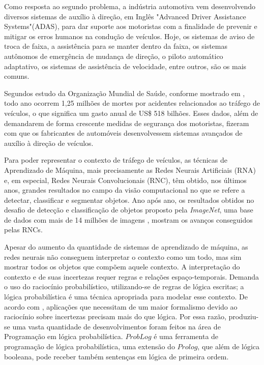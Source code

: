 \documentclass[
	12pt,				%
    oneside,			%
	a4paper,			%
	english,			%
	french,				%
	spanish,			%
	brazil,				%
	]{abntex2}
\begin{document}
Como resposta ao segundo problema, a indústria automotiva vem desenvolvendo diversos sistemas de auxílio à direção, em Inglês "Advanced Driver Assistance Systems"\newline (ADAS), para dar suporte aos motoristas com a finalidade de prevenir e mitigar os erros humanos na condução de veículos. Hoje, os sistemas de aviso de troca de faixa, a assistência para se manter dentro da faixa, os sistemas autônomos de emergência de mudança de direção, o  piloto automático adaptativo, os  sistemas de assistência de velocidade, entre outros, são os mais comuns.

Segundos estudo da Organização Mundial de Saúde, conforme mostrado em , todo ano ocorrem 1,25 milhões de mortes por acidentes relacionados ao tráfego de veículos, o que significa um gasto anual de US\$ 518 bilhões. Esses dados, além de demandarem de forma crescente medidas de segurança dos motoristas, fizeram com que os fabricantes de automóveis desenvolvessem sistemas avançados de auxílio à direção de veículos. 

Para poder representar o contexto de tráfego de veículos, as técnicas de Aprendizado de Máquina, mais precisamente as Redes Neurais Artificiais (RNA) e, em especial, Redes Neurais Convolucionais (RNC), têm obtido, nos últimos anos,  grandes resultados no campo da visão computacional no que se refere a detectar, classificar e segmentar objetos. Ano após ano, os resultados obtidos no desafio de detecção e classificação de objetos proposto pela \textit{ImageNet}, uma base de dados com mais de 14 milhões de imagens , mostram os avanços conseguidos pelas RNCs.

Apesar do aumento da quantidade de sistemas de aprendizado de máquina, as redes neurais não conseguem interpretar o contexto como um todo, mas sim mostrar todos os objetos que compõem aquele contexto. A interpretação do contexto e de suas incertezas requer regras e relações espaço-temporais. Demanda o uso do raciocínio probabilístico, utilizando-se de regras de lógica escritas; a lógica probabilística é uma técnica apropriada para modelar esse contexto. De acordo com , aplicações que necessitam de um maior formalismo devido ao raciocínio sobre incertezas precisam mais do que lógica. Por essa razão, produziu-se uma vasta quantidade de desenvolvimentos foram feitos na área de Programação em lógica probabilística. $ProbLog$ é uma ferramenta de programação de lógica probabilística, uma extensão do $Prolog$, que além de lógica booleana, pode receber também sentenças em lógica de primeira ordem.
\end{document}

